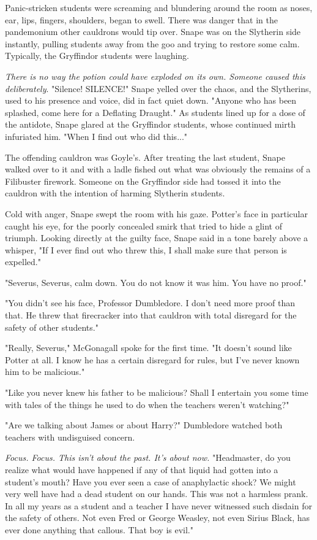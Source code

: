 \documentclass[a4paper,11pt]{article}
\begin{document}
Panic-stricken students were screaming and blundering around the room as noses, ear, lips, fingers, shoulders, began to swell. There was danger that in the pandemonium other cauldrons would tip over. Snape was on the Slytherin side instantly, pulling students away from the goo and trying to restore some calm. Typically, the Gryffindor students were laughing.

\emph{There is no way the potion could have exploded on its own. Someone caused this deliberately}. "Silence! SILENCE!" Snape yelled over the chaos, and the Slytherins, used to his presence and voice, did in fact quiet down. "Anyone who has been splashed, come here for a Deflating Draught." As students lined up for a dose of the antidote, Snape glared at the Gryffindor students, whose continued mirth infuriated him. "When I find out who did this..."

The offending cauldron was Goyle's. After treating the last student, Snape walked over to it and with a ladle fished out what was obviously the remains of a Filibuster firework. Someone on the Gryffindor side had tossed it into the cauldron with the intention of harming Slytherin students.

Cold with anger, Snape swept the room with his gaze. Potter's face in particular caught his eye, for the poorly concealed smirk that tried to hide a glint of triumph. Looking directly at the guilty face, Snape said in a tone barely above a whisper, "If I ever find out who threw this, I shall make sure that person is expelled."

"Severus, Severus, calm down. You do not know it was him. You have no proof."

"You didn't see his face, Professor Dumbledore. I don't need more proof than that. He threw that firecracker into that cauldron with total disregard for the safety of other students."

"Really, Severus," McGonagall spoke for the first time. "It doesn't sound like Potter at all. I know he has a certain disregard for rules, but I've never known him to be malicious."

"Like you never knew his father to be malicious? Shall I entertain you some time with tales of the things he used to do when the teachers weren't watching?"

"Are we talking about James or about Harry?" Dumbledore watched both teachers with undisguised concern.

\emph{Focus. Focus. This isn't about the past. It's about now.} "Headmaster, do you realize what would have happened if any of that liquid had gotten into a student's mouth? Have you ever seen a case of anaphylactic shock? We might very well have had a dead student on our hands. This was not a harmless prank. In all my years as a student and a teacher I have never witnessed such disdain for the safety of others. Not even Fred or George Weasley, not even Sirius Black, has ever done anything that callous. That boy is evil."
\end{document}

